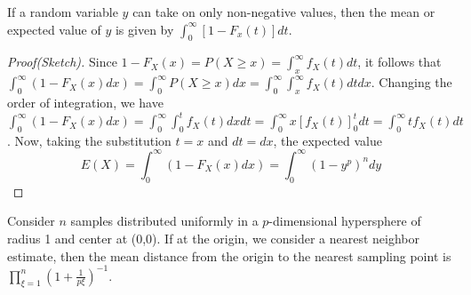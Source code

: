 \documentclass[11pt,a4paper]{article}
\begin{document}
\begin{lemma}\label{Lemma:expected_val}
If a random variable $y$ can take on only non-negative values, then the mean or expected value of $y$ is given by $\int_0^\infty [1-F_x(t)]dt$.
\end{lemma}
\begin{proof}[Proof(Sketch)] Since $1-F_X(x) = P(X \geq x) = \int_x^{\infty}f_X(t) dt$, it follows that
$\int_0^\infty(1-F_X(x)dx) = \int_0^{\infty}P(X \geq x)dx = \int_0^{\infty}\int_x^{\infty}f_X(t)dtdx$.
Changing the order of integration, we have
$\int_0^\infty(1-F_X(x)dx) = \int_0^{\infty} \int_0^t f_X(t)dxdt = \int_0^{\infty}x[f_X(t)]_0^t dt = \int_0^{\infty}tf_X(t)dt$.
Now, taking the substitution $t=x$ and $dt=dx$, the expected value\\
\begin{equation}
E(X) = \int_0^\infty(1-F_X(x)dx) = \int_0^{\infty} (1-y^p)^n dy
\end{equation}
\end{proof}

\begin{lemma}\label{Lemma:mean_seperation}
Consider $n$ samples distributed uniformly in a $p$-dimensional hypersphere of radius 1 and center at (0,0). If at the origin, we consider a nearest neighbor estimate, then the mean distance from the origin to the nearest sampling point is $\prod_{\xi=1}^n (1 + \frac{1}{p\xi})^{-1}$.
\end{lemma}
\end{document}
